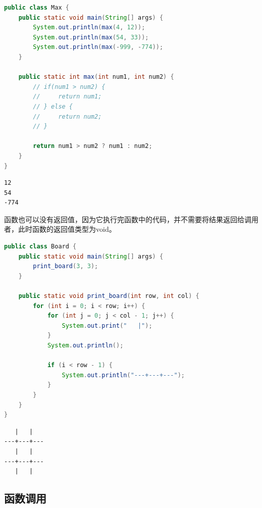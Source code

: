 \vspace{0.5cm}


\begin{lstlisting}[language=Java]
public class Max {
	public static void main(String[] args) {
		System.out.println(max(4, 12));
		System.out.println(max(54, 33));
		System.out.println(max(-999, -774));
	}

	public static int max(int num1, int num2) {
		// if(num1 > num2) {
		//     return num1;
		// } else {
		//     return num2;
		// }

		return num1 > num2 ? num1 : num2;
	}
}
\end{lstlisting}

\begin{tcolorbox}
	\begin{verbatim}
12
54
-774
	\end{verbatim}
\end{tcolorbox}

函数也可以没有返回值，因为它执行完函数中的代码，并不需要将结果返回给调用者，此时函数的返回值类型为void。\\


\begin{lstlisting}[language=Java]
public class Board {
    public static void main(String[] args) {
        print_board(3, 3);
    }

    public static void print_board(int row, int col) {
        for (int i = 0; i < row; i++) {
            for (int j = 0; j < col - 1; j++) {
                System.out.print("   |");
            }
            System.out.println();

            if (i < row - 1) {
                System.out.println("---+---+---");
            }
        }
    }
}
\end{lstlisting}

\begin{tcolorbox}
	\begin{verbatim}
   |   |
---+---+---
   |   |
---+---+---
   |   |
	\end{verbatim}
\end{tcolorbox}

\vspace{0.5cm}

\subsection{函数调用}

